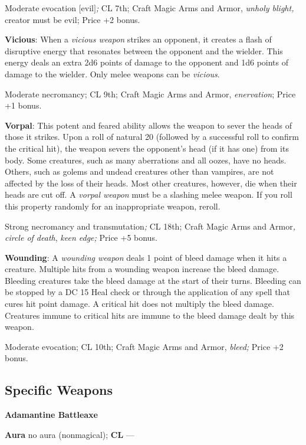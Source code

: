 Moderate evocation \mbox{$[$}evil\mbox{$]$}\textit{; }CL 7th; Craft Magic Arms and Armor, \textit{unholy blight, }creator must be evil; Price +2 bonus.
				
\textbf{Vicious}: When a \textit{vicious weapon} strikes an opponent, it creates a flash of disruptive energy that resonates between the opponent and the wielder. This energy deals an extra 2d6 points of damage to the opponent and 1d6 points of damage to the wielder. Only melee weapons can be \textit{vicious}.
				
Moderate necromancy; CL 9th; Craft Magic Arms and Armor, \textit{enervation}; Price +1 bonus.
				
\textbf{Vorpal}: This potent and feared ability allows the weapon to sever the heads of those it strikes. Upon a roll of natural 20 (followed by a successful roll to confirm the critical hit), the weapon severs the opponent's head (if it has one) from its body. Some creatures, such as many aberrations and all oozes, have no heads. Others, such as golems and undead creatures other than vampires, are not affected by the loss of their heads. Most other creatures, however, die when their heads are cut off. A \textit{vorpal weapon} must be a slashing melee weapon. If you roll this property randomly for an inappropriate weapon, reroll.
				
Strong necromancy and transmutation\textit{; }CL 18th; Craft Magic Arms and Armor\textit{, circle of death}, \textit{keen edge; }Price +5 bonus.
				
\textbf{Wounding}: A \textit{wounding weapon} deals 1 point of bleed damage when it hits a creature. Multiple hits from a wounding weapon increase the bleed damage. Bleeding creatures take the bleed damage at the start of their turns. Bleeding can be stopped by a DC 15 Heal check or through the application of any spell that cures hit point damage. A critical hit does not multiply the bleed damage. Creatures immune to critical hits are immune to the bleed damage dealt by this weapon.
				
Moderate evocation; CL 10th; Craft Magic Arms and Armor, \textit{bleed; }Price +2 bonus.
				
\subsection{Specific Weapons}

				
\textbf{Adamantine Battleaxe}
				
\textbf{Aura} no aura (nonmagical);\textbf{ CL }---
				
